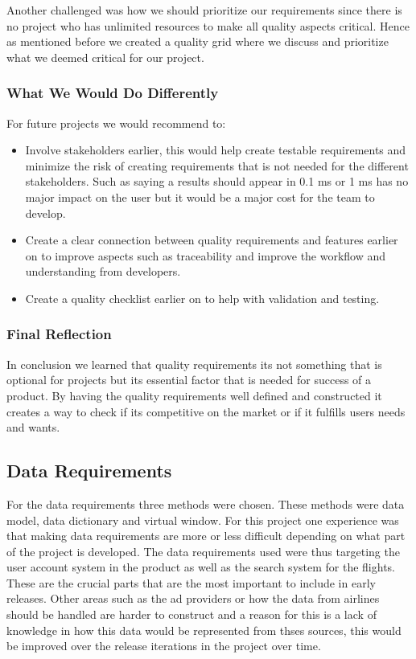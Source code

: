 Another challenged was how we should prioritize our requirements since there is no project who has unlimited resources to make all quality aspects critical. Hence as mentioned before we created a quality grid where we discuss and prioritize what we deemed critical for our project.


\subsubsection{What We Would Do Differently}
For future projects we would recommend to:
\begin{itemize}
    \item Involve stakeholders earlier, this would help create testable requirements and minimize the risk of creating requirements that is not needed for the different stakeholders. Such as saying a results should appear in 0.1 ms or 1 ms has no major impact on the user but it would be a major cost for the team to develop.
    \item Create a clear connection between quality requirements and features earlier on to improve aspects such as traceability and improve the workflow and understanding from developers.
    \item Create a quality checklist earlier on to help with validation and testing.
\end{itemize}

\subsubsection{Final Reflection}
In conclusion we learned that quality requirements its not something that is optional for projects but its essential factor that is needed for success of a product. By having the quality requirements well defined and constructed it creates a way to check if its competitive on the market or if it fulfills users needs and wants.



\subsection{Data Requirements}

For the data requirements three methods were chosen. These methods were data model, data dictionary and virtual window. For this project one experience was that
making data requirements are more or less difficult depending on what part of the project is developed. The data requirements used were thus targeting the user
account system in the product as well as the search system for the flights. These are the crucial parts that are the most important to include in early releases.
Other areas such as the ad providers or how the data from airlines should be handled are harder to construct and a reason for this is a lack of knowledge in
how this data would be represented from thses sources, this would be improved over the release iterations in the project over time.

